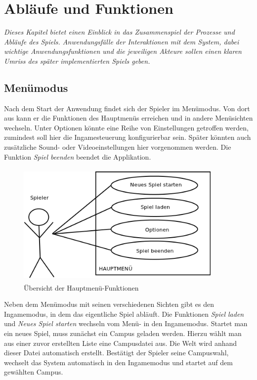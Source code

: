 \chapter{Abläufe und Funktionen}

\textit{Dieses Kapitel bietet einen Einblick in das Zusammenspiel der Prozesse und Abläufe des Spiels.
Anwendungsfälle der Interaktionen mit dem System, dabei wichtige Anwendungsfunktionen und die jeweiligen 
Akteure sollen einen klaren Umriss des später implementierten Spiels geben.}

\section{Menümodus}
Nach dem Start der Anwendung findet sich der \gls{Spieler} im Menümodus. Von dort aus kann er die Funktionen
des Hauptmenüs erreichen und in andere Menüsichten wechseln. Unter Optionen könnte eine Reihe von 
Einstellungen getroffen werden, zumindest soll hier die Ingamesteuerung konfigurierbar sein. Später könnten
auch zusätzliche Sound- oder Videoeinstellungen hier vorgenommen werden. Die Funktion \textit{Spiel beenden}
beendet die Applikation.

\begin{figure}[htb]
	\begin{center} 
		\includegraphics[width=100mm, height=60mm]
                  {kapitel/funktionen/Hauptmenue.png}
	\end{center}
	\caption{Übersicht der Hauptmenü-Funktionen}
	\label{fig:hauptmenue_funktionen}
\end{figure}

Neben dem Menümodus mit seinen verschiedenen Sichten gibt es den Ingamemodus, in dem das eigentliche Spiel
abläuft. Die Funktionen \textit{Spiel laden} und \textit{Neues Spiel starten} wechseln vom Menü- in den
Ingamemodus. Startet man ein neues Spiel, muss zunächst ein \gls{Campus} geladen werden. Hierzu wählt man 
aus einer zuvor erstellten Liste eine Campusdatei aus. Die \gls{Welt} wird anhand dieser Datei automatisch 
erstellt. Bestätigt der Spieler seine Campuswahl, wechselt das System automatisch in den Ingamemodus und
startet auf dem gewählten Campus.

